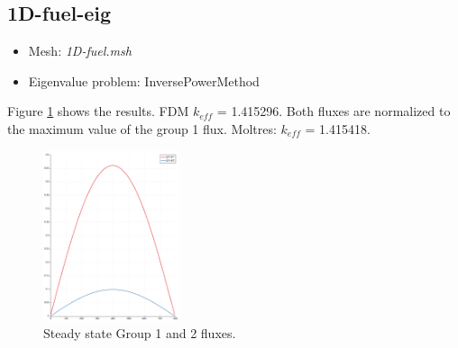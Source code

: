 \documentclass[11pt,letterpaper]{article}
\begin{document}
\subsection{1D-fuel-eig}

	\begin{itemize}
		\item Mesh: \textit{1D-fuel.msh}
		\item Eigenvalue problem: InversePowerMethod
	\end{itemize}

Figure \ref{fig:1D-fuel-eig} shows the results. 
FDM $k_{eff}$ = 1.415296. Both fluxes are normalized to the maximum value of the group 1 flux.
Moltres: $k_{eff}$ = 1.415418.

	\begin{figure}[htbp!]
		\centering
		\includegraphics[height=5cm]{1D-fuel-eig}
		\caption{Steady state Group 1 and 2 fluxes.}
		\label{fig:1D-fuel-eig}
	\end{figure}
\end{document}
